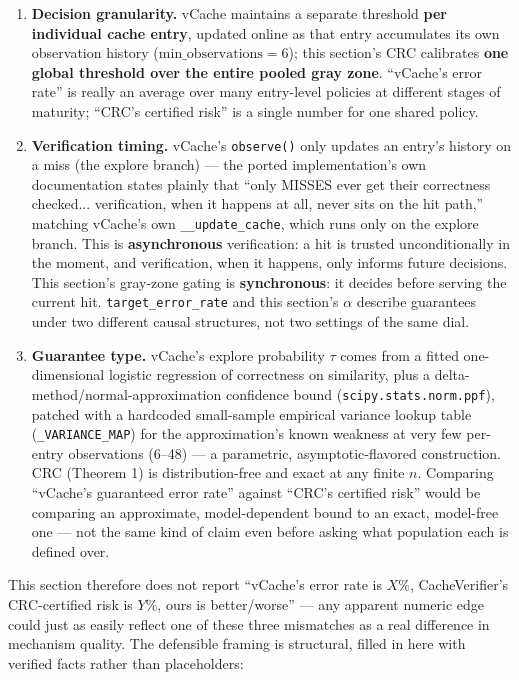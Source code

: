 \documentclass[11pt]{article}
\begin{document}
\begin{enumerate}[nosep]
  \item \textbf{Decision granularity.} vCache maintains a separate threshold \textbf{per individual cache entry}, updated online as that entry accumulates its own observation history ($\text{min\_observations}=6$); this section's CRC calibrates \textbf{one global threshold over the entire pooled gray zone}. ``vCache's error rate'' is really an average over many entry-level policies at different stages of maturity; ``CRC's certified risk'' is a single number for one shared policy.
  \item \textbf{Verification timing.} vCache's \texttt{observe()} only updates an entry's history on a miss (the explore branch) --- the ported implementation's own documentation states plainly that ``only MISSES ever get their correctness checked... verification, when it happens at all, never sits on the hit path,'' matching vCache's own \texttt{\_\allowbreak{}\_\allowbreak{}update\_\allowbreak{}cache}, which runs only on the explore branch. This is \textbf{asynchronous} verification: a hit is trusted unconditionally in the moment, and verification, when it happens, only informs future decisions. This section's gray-zone gating is \textbf{synchronous}: it decides before serving the current hit. \texttt{target\_\allowbreak{}error\_\allowbreak{}rate} and this section's $\alpha$ describe guarantees under two different causal structures, not two settings of the same dial.
  \item \textbf{Guarantee type.} vCache's explore probability $\tau$ comes from a fitted one-dimensional logistic regression of correctness on similarity, plus a delta-method/normal-approximation confidence bound (\texttt{scipy.\allowbreak{}stats.\allowbreak{}norm.\allowbreak{}ppf}), patched with a hardcoded small-sample empirical variance lookup table (\texttt{\_\allowbreak{}VARIANCE\_\allowbreak{}MAP}) for the approximation's known weakness at very few per-entry observations (6--48) --- a parametric, asymptotic-flavored construction. CRC (Theorem 1) is distribution-free and exact at any finite $n$. Comparing ``vCache's guaranteed error rate'' against ``CRC's certified risk'' would be comparing an approximate, model-dependent bound to an exact, model-free one --- not the same kind of claim even before asking what population each is defined over.
\end{enumerate}

This section therefore does not report ``vCache's error rate is $X\%$, CacheVerifier's CRC-certified risk is $Y\%$, ours is better/worse'' --- any apparent numeric edge could just as easily reflect one of these three mismatches as a real difference in mechanism quality. The defensible framing is structural, filled in here with verified facts rather than placeholders:
\end{document}
